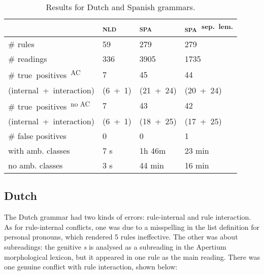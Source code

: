 {{\begin{table}[h]
\centering
\begin{tabular}{|p{2.84cm}|p{1cm}|p{1.15cm}|p{1.55cm}|}

\hline
                   & \textsc{nld}  & \textsc{spa}  & \textsc{spa}~\textsuperscript{sep.~lem.} \\ \hline
\# rules           & 59            & 279       & 279     \\ \hline
\# readings        & 336           & 3905      & 1735    \\ \hline
\# true~positives~\textsuperscript{AC}%
                   & 7             & 45        & 44      \\ 
{\small (internal~+~interaction)}
                   & {\small
                      (6~+~1)}     & {\small 
                                    (21~+~24)} & {\small (20~+~24)} \\ \hline

\# true~positives~\textsuperscript{no AC}  & 7             & 43        & 42      \\ 
{\small (internal~+~interaction)}
                   & {\small
                      (6~+~1)}     & {\small 
                                    (18~+~25)} & {\small (17~+~25)} \\ \hline
\# false positives 
                   & 0             & 0        & 1  \\ \hline

\clock{} with amb. 
           classes & 7 s        & 1h 46m   &  23 min  \\ \hline

\clock{} no amb. 
           classes & 3 s        & 44 min       & 16 min     \\ \hline 


\end{tabular}
\caption{Results for Dutch and Spanish grammars.}
\label{table:res}
\end{table}

\subsection{Dutch} The Dutch grammar had two kinds of errors: rule-internal and rule interaction. As for rule-internal conflicts, one was due to a misspelling in the list definition for personal pronouns, which rendered 5 rules ineffective. The other was about subreadings: the genitive \emph{s} is analysed as a subreading in the Apertium morphological lexicon, but it appeared in one rule as the main reading. 
There was one genuine conflict with rule interaction, shown below:

}}
